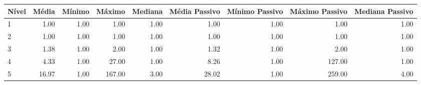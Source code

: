 \begin{table}[ht]
\centering
\begin{tabular}{lrrrrrrrr}
  \hline
Nível & Média & Mínimo & Máximo & Mediana & Média Passivo & Mínimo Passivo & Máximo Passivo & Mediana Passivo \\ 
  \hline
1 & 1.00 & 1.00 & 1.00 & 1.00 & 1.00 & 1.00 & 1.00 & 1.00 \\ 
  2 & 1.00 & 1.00 & 1.00 & 1.00 & 1.00 & 1.00 & 1.00 & 1.00 \\ 
  3 & 1.38 & 1.00 & 2.00 & 1.00 & 1.32 & 1.00 & 2.00 & 1.00 \\ 
  4 & 4.33 & 1.00 & 27.00 & 1.00 & 8.26 & 1.00 & 127.00 & 1.00 \\ 
  5 & 16.97 & 1.00 & 167.00 & 3.00 & 28.02 & 1.00 & 259.00 & 4.00 \\ 
   \hline
\end{tabular}
\end{table}
